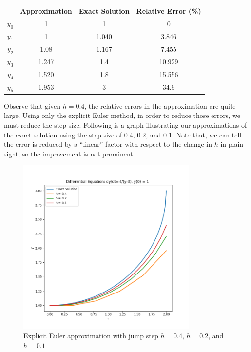 \documentclass[a4paper]{article}
\begin{document}
\begin{table}[H]
  \centering
  \begin{tabular}{@{}cSSS@{}}
    \toprule
    {}      & {Approximation} & {Exact Solution} & {Relative Error (\%)} \\
    \midrule
    \(y_0\) & 1               & 1                & 0                     \\
    \(y_1\) & 1               & 1.040            & 3.846                 \\
    \(y_2\) & 1.08            & 1.167            & 7.455                 \\
    \(y_3\) & 1.247           & 1.4              & 10.929                \\
    \(y_4\) & 1.520           & 1.8              & 15.556                \\
    \(y_5\) & 1.953           & 3                & 34.9                  \\
    \bottomrule
  \end{tabular}
\end{table}

Observe that given \(h = 0.4\), the relative errors in the approximation are quite large. Using only the explicit Euler method, in order to reduce those errors, we must reduce the step size. Following is a graph illustrating our approximations of the exact solution using the step size of \(0.4\), \(0.2\), and \(0.1\). Note that, we can tell the error is reduced by a ``linear'' factor with respect to the change in \(h\) in plain sight, so the improvement is not prominent.

\begin{figure}[H]
  \centering
  \includegraphics[width=0.8\textwidth]{plot_euler.png}
  \caption{Explicit Euler approximation with jump step \(h = 0.4\), \(h = 0.2\), and \(h = 0.1\)}
\end{figure}
\end{document}
